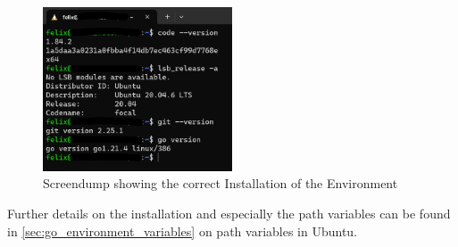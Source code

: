 \begin{figure}[H]
	\centering
	\includegraphics[width=0.5\textwidth]{figures/goLang/installation_screendump.png}
	\caption{Screendump showing the correct Installation of the Environment}
	\label{fig:screendump_installation}
\end{figure}

Further details on the installation and especially the path variables can be found in \autoref{sec:go_environment_variables} on path variables in Ubuntu.